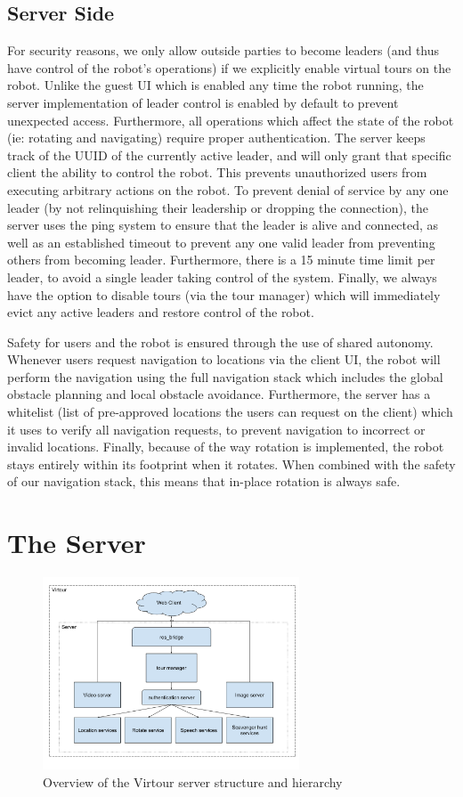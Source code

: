 \documentclass[
  oneside,
  11pt, a4paper,
  footinclude=true,
  headinclude=true,
  cleardoublepage=empty
]{article}
\begin{document}
\subsection{Server Side}

For security reasons, we only allow outside parties to become leaders (and thus
have control of the robot's operations) if we explicitly enable virtual tours
on the robot. Unlike the guest UI which is enabled any time the robot running,
the server implementation of leader control is enabled by default to prevent
unexpected access. Furthermore, all operations which affect the state of the
robot (ie: rotating and navigating) require proper authentication. The server
keeps track of the UUID of the currently active leader, and will only grant
that specific client the ability to control the robot. This prevents
unauthorized users from executing arbitrary actions on the robot. To prevent
denial of service by any one leader (by not relinquishing their leadership or
dropping the connection), the server uses the ping system to ensure that the
leader is alive and connected, as well as an established timeout to prevent any
one valid leader from preventing others from becoming leader. Furthermore,
there is a 15 minute time limit per leader, to avoid a single leader taking
control of the system. Finally, we always have the option to disable tours (via
the tour manager) which will immediately evict any active leaders and restore
control of the robot.

Safety for users and the robot is ensured through the use of shared autonomy.
Whenever users request navigation to locations via the client UI, the robot
will perform the navigation using the full navigation stack which includes the
global obstacle planning and local obstacle avoidance. Furthermore, the server
has a whitelist (list of pre-approved locations the users can request on the
client) which it uses to verify all navigation requests, to prevent navigation
to incorrect or invalid locations. Finally, because of the way rotation is
implemented, the robot stays entirely within its footprint when it rotates.
When combined with the safety of our navigation stack, this means that in-place
rotation is always safe.


\section{The Server}

\begin{figure}
\centering
\includegraphics[width=3in]{virtour_server}
\caption{Overview of the Virtour server structure and hierarchy}
\end{figure}
\end{document}
